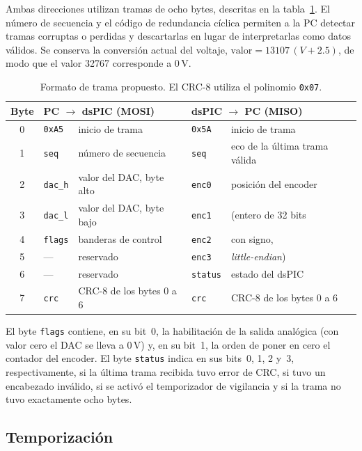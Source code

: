 \documentclass[11pt]{article}
\newcommand{\code}[1]{\texttt{#1}}
\begin{document}
Ambas direcciones utilizan tramas de ocho bytes, descritas en la
tabla~\ref{tab:trama}. El número de secuencia y el código de redundancia
cíclica permiten a la PC detectar tramas corruptas o perdidas y descartarlas
en lugar de interpretarlas como datos válidos. Se conserva la conversión
actual del voltaje, $\text{valor} = 13107\,(V + 2.5)$, de modo que el valor
32767 corresponde a 0\,V.

\begin{table}[tbp]
\centering
\small
\begin{tabular}{@{}cll|ll@{}}
\toprule
Byte & \multicolumn{2}{l|}{PC $\to$ dsPIC (MOSI)} & \multicolumn{2}{l}{dsPIC $\to$ PC (MISO)} \\ \midrule
0   & \code{0xA5}   & inicio de trama              & \code{0x5A}   & inicio de trama \\
1   & \code{seq}    & número de secuencia          & \code{seq}    & eco de la última trama válida \\
2   & \code{dac\_h} & valor del DAC, byte alto     & \code{enc0}   & posición del encoder \\
3   & \code{dac\_l} & valor del DAC, byte bajo     & \code{enc1}   & (entero de 32 bits \\
4   & \code{flags}  & banderas de control          & \code{enc2}   & con signo, \\
5   & ---           & reservado                    & \code{enc3}   & \emph{little-endian}) \\
6   & ---           & reservado                    & \code{status} & estado del dsPIC \\
7   & \code{crc}    & CRC-8 de los bytes 0 a 6     & \code{crc}    & CRC-8 de los bytes 0 a 6 \\
\bottomrule
\end{tabular}
\caption{Formato de trama propuesto. El CRC-8 utiliza el polinomio \code{0x07}.}
\label{tab:trama}
\end{table}

El byte \code{flags} contiene, en su bit~0, la habilitación de la salida
analógica (con valor cero el DAC se lleva a 0\,V) y, en su bit~1, la orden de
poner en cero el contador del encoder. El byte \code{status} indica en sus
bits~0, 1, 2 y~3, respectivamente, si la última trama recibida tuvo error de
CRC, si tuvo un encabezado inválido, si se activó el temporizador de vigilancia
y si la trama no tuvo exactamente ocho bytes.

\subsection{Temporización}
\end{document}
